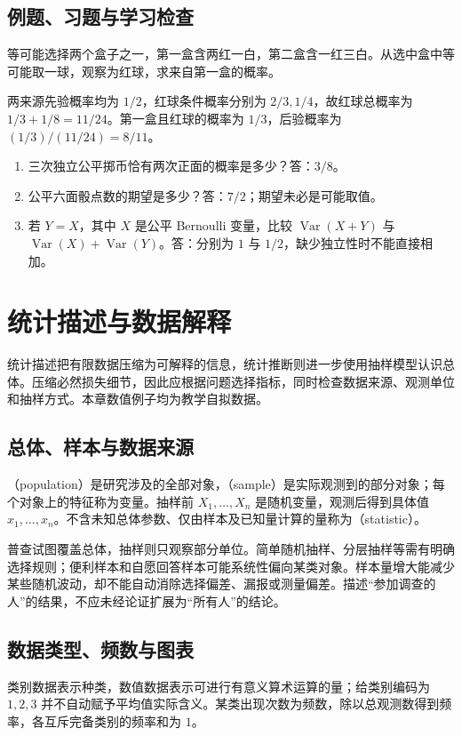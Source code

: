 \documentclass[UTF8]{ctexbook}
\begin{document}
\section{例题、习题与学习检查}
\begin{example}
等可能选择两个盒子之一，第一盒含两红一白，第二盒含一红三白。从选中盒中等可能取一球，观察为红球，求来自第一盒的概率。
\end{example}
\begin{solve}
两来源先验概率均为 $1/2$，红球条件概率分别为 $2/3,1/4$，故红球总概率为 $1/3+1/8=11/24$。第一盒且红球的概率为 $1/3$，后验概率为 $(1/3)/(11/24)=8/11$。
\end{solve}
\begin{enumerate}
\item 三次独立公平掷币恰有两次正面的概率是多少？答：$3/8$。
\item 公平六面骰点数的期望是多少？答：$7/2$；期望未必是可能取值。
\item 若 $Y=X$，其中 $X$ 是公平 Bernoulli 变量，比较 $\operatorname{Var}(X+Y)$ 与 $\operatorname{Var}(X)+\operatorname{Var}(Y)$。答：分别为 $1$ 与 $1/2$，缺少独立性时不能直接相加。
\end{enumerate}

\chapter{统计描述与数据解释}
\label{chap:em-statistics}
统计描述把有限数据压缩为可解释的信息，统计推断则进一步使用抽样模型认识总体。压缩必然损失细节，因此应根据问题选择指标，同时检查数据来源、观测单位和抽样方式。本章数值例子均为教学自拟数据。

\section{总体、样本与数据来源}
（population）是研究涉及的全部对象，（sample）是实际观测到的部分对象；每个对象上的特征称为变量。抽样前 $X_1,\ldots,X_n$ 是随机变量，观测后得到具体值 $x_1,\ldots,x_n$。不含未知总体参数、仅由样本及已知量计算的量称为（statistic）。

普查试图覆盖总体，抽样则只观察部分单位。简单随机抽样、分层抽样等需有明确选择规则；便利样本和自愿回答样本可能系统性偏向某类对象。样本量增大能减少某些随机波动，却不能自动消除选择偏差、漏报或测量偏差。描述“参加调查的人”的结果，不应未经论证扩展为“所有人”的结论。

\section{数据类型、频数与图表}
类别数据表示种类，数值数据表示可进行有意义算术运算的量；给类别编码为 $1,2,3$ 并不自动赋予平均值实际含义。某类出现次数为频数，除以总观测数得到频率，各互斥完备类别的频率和为 $1$。
\end{document}
